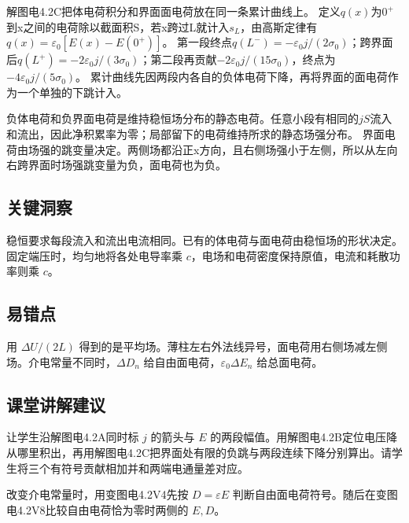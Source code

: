 \documentclass[UTF8,fontset=fandol,a4paper,11pt]{ctexart}
\begin{document}
解图电4.2C把体电荷积分和界面面电荷放在同一条累计曲线上。
定义$q(x)$为$0^+$到x之间的电荷除以截面积S，若x跨过L就计入$s_L$，由高斯定律有$q(x)=\varepsilon_0[E(x)-E(0^+)]$。
第一段终点$q(L^-)=-\varepsilon_0j/(2\sigma_0)$；跨界面后$q(L^+)=-2\varepsilon_0j/(3\sigma_0)$；第二段再贡献$-2\varepsilon_0j/(15\sigma_0)$，终点为$-4\varepsilon_0j/(5\sigma_0)$。
累计曲线先因两段内各自的负体电荷下降，再将界面的面电荷作为一个单独的下跳计入。

负体电荷和负界面电荷是维持稳恒场分布的静态电荷。任意小段有相同的$jS$流入和流出，因此净积累率为零；局部留下的电荷维持所求的静态场强分布。
界面电荷由场强的跳变量决定。两侧场都沿正x方向，且右侧场强小于左侧，所以从左向右跨界面时场强跳变量为负，面电荷也为负。




\subsection*{关键洞察}

稳恒要求每段流入和流出电流相同。已有的体电荷与面电荷由稳恒场的形状决定。固定端压时，均匀地将各处电导率乘 $c$，电场和电荷密度保持原值，电流和耗散功率则乘 $c$。



\subsection*{易错点}

用 $\Delta U/(2L)$ 得到的是平均场。薄柱左右外法线异号，面电荷用右侧场减左侧场。介电常量不同时，$\Delta D_n$ 给自由面电荷，$\varepsilon_0\Delta E_n$ 给总面电荷。



\subsection*{课堂讲解建议}

让学生沿解图电4.2A同时标 $j$ 的箭头与 $E$ 的两段幅值。用解图电4.2B定位电压降从哪里积出，再用解图电4.2C把界面处有限的负跳与两段连续下降分别算出。请学生将三个有符号贡献相加并和两端电通量差对应。

改变介电常量时，用变图电4.2V4先按 $D=\varepsilon E$ 判断自由面电荷符号。随后在变图电4.2V8比较自由电荷恰为零时两侧的 $E,D$。
\end{document}
